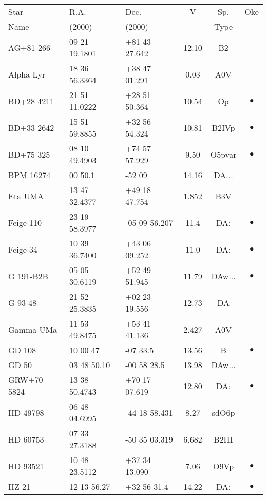 \begin{table}[htbp]

\begin{center}
\begin{tabular}{lllccc}
Star        &      R.A.     &      Dec.     &     V   &  Sp.   & Oke \\
Name        &    (2000)     &    (2000)     &         & Type   & \\ \hline
AG+81 266   & 09 21 19.1801 & +81 43 27.642 &  12.10  & B2     &   \\
Alpha Lyr   & 18 36 56.3364 & +38 47 01.291 &   0.03  & A0V    &   \\
BD+28 4211  & 21 51 11.0222 & +28 51 50.364 &  10.54  & Op     & $\bullet$ \\
BD+33 2642  & 15 51 59.8855 & +32 56 54.324 &  10.81  & B2IVp  & $\bullet$ \\
BD+75 325   & 08 10 49.4903 & +74 57 57.929 &   9.50  & O5pvar & $\bullet$ \\
BPM 16274   & 00 50.1       & -52 09        &  14.16  & DA...  &   \\
Eta UMA     & 13 47 32.4377 & +49 18 47.754 &   1.852 & B3V    &   \\
Feige 110   & 23 19 58.3977 & -05 09 56.207 &  11.4   & DA:    & $\bullet$ \\
Feige 34    & 10 39 36.7400 & +43 06 09.252 &  11.0   & DA:    & $\bullet$ \\ 
G 191-B2B   & 05 05 30.6119 & +52 49 51.945 &  11.79  & DAw... & $\bullet$ \\
G 93-48     & 21 52 25.3835 & +02 23 19.556 &  12.73  & DA     &   \\
Gamma UMa   & 11 53 49.8475 & +53 41 41.136 &   2.427 & A0V    &   \\
GD 108      & 10 00 47      & -07 33.5      &  13.56  & B      & $\bullet$ \\
GD 50       & 03 48 50.10   & -00 58 28.5   &  13.98  & DAw... &   \\
GRW+70 5824 & 13 38 50.4743 & +70 17 07.619 &  12.80  & DA:    & $\bullet$ \\
HD 49798    & 06 48 04.6995 & -44 18 58.431 &   8.27  & sdO6p  &   \\
HD 60753    & 07 33 27.3188 & -50 35 03.319 &   6.682 & B2III  &   \\
HD 93521    & 10 48 23.5112 & +37 34 13.090 &   7.06  & O9Vp   & $\bullet$ \\
HZ 21       & 12 13 56.27   & +32 56 31.4   &  14.22  & DA:    & $\bullet$ \\

\end{tabular}
\end{center}
\end{table}
